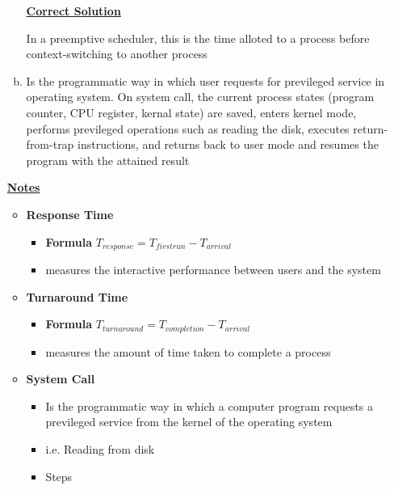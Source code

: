 \documentclass[12pt]{article}
\begin{document}
\begin{enumerate}[1.]
\begin{enumerate}[a)]
        \bigskip

        \begin{mdframed}
        \underline{\textbf{Correct Solution}}

        \bigskip

        \color{red}In a preemptive scheduler, this is the time alloted to a process before context-switching
        to another process\color{black}
        \end{mdframed}

        \item Is the programmatic way in which user requests for previleged service in operating system.
        On system call, the current process states (program counter, CPU register, kernal state) are saved,
        enters kernel mode, performs previleged operations such as reading the disk,
        executes return-from-trap instructions, and returns back to user mode and resumes
        the program with the attained result
    \end{enumerate}

    \bigskip

    \underline{\textbf{Notes}}

    \begin{itemize}
        \item \textbf{Response Time}
        \begin{itemize}
            \item \textbf{Formula} $T_{response} = T_{firstrun} - T_{arrival}$
            \item measures the interactive performance between users and the system
        \end{itemize}

        \item \textbf{Turnaround Time}

        \begin{itemize}
            \item \textbf{Formula} $T_{turnaround} = T_{completion} - T_{arrival}$
            \item measures the amount of time taken to complete a process
        \end{itemize}

        \item \textbf{System Call}

        \begin{itemize}
            \item Is the programmatic way in which a computer program requests a previleged service from the kernel of the operating system
            \item i.e. Reading from disk
            \item Steps


\end{itemize}
\end{itemize}
\end{enumerate}
\end{document}
